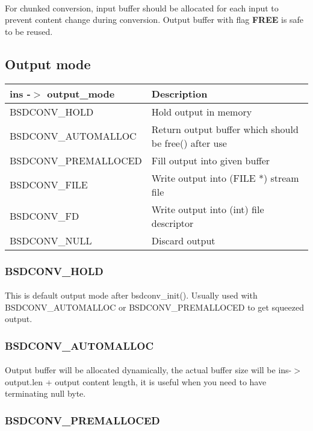\documentclass{article}
\begin{document}
			\paragraph{}
				For chunked conversion, input buffer should be allocated for each input to prevent content change during conversion. Output buffer with flag \textbf{FREE} is safe to be reused.
		\subsection{Output mode}
			\begin{tabular}{|l|l|}
				\hline
				ins -$>$ output\_mode & Description \\
				\hline
				BSDCONV\_HOLD & Hold output in memory \\
				BSDCONV\_AUTOMALLOC & Return output buffer which should be free() after use\\
				BSDCONV\_PREMALLOCED & Fill output into given buffer\\
				BSDCONV\_FILE & Write output into (FILE *) stream file \\
				BSDCONV\_FD & Write output into (int) file descriptor \\
				BSDCONV\_NULL & Discard output \\
				\hline
			\end{tabular}
			\subsubsection{BSDCONV\_HOLD}
				\paragraph{}
				This is default output mode after bsdconv\_init(). Usually used with BSDCONV\_AUTOMALLOC or BSDCONV\_PREMALLOCED to get squeezed output.
			\subsubsection{BSDCONV\_AUTOMALLOC}
				\paragraph{}
				Output buffer will be allocated dynamically, the actual buffer size will be ins-$>$output.len + output content length, it is useful when you need to have terminating null byte.
			\subsubsection{BSDCONV\_PREMALLOCED}
\end{document}

